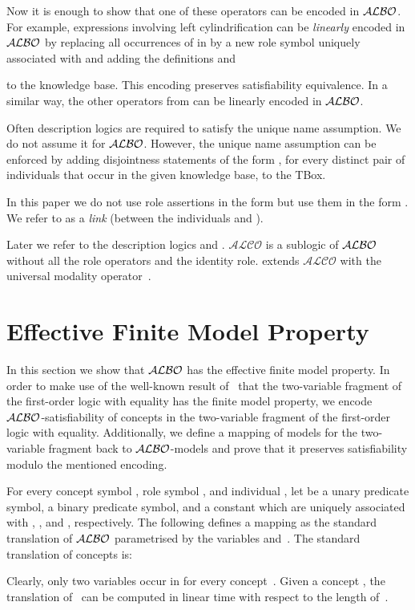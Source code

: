 \documentclass[leqno
,pdflatex
,prodmode
,acmtocl
]{acmsmall}
\newcommand{\mathcmd}[1]{\ensuremath{#1}\xspace}
\newcommand{\dlfont}{\mathcal}
\newcommand{\dl}[1]{\mathcmd{\dlfont{#1}}}
\newcommand{\ALBOid}{\dl{ALBO\smash[t]{\mbox{}}}}
\newcommand{\ALCO}{\dl{ALCO}}
\begin{document}
Now it is enough to show that one of these operators can be encoded in \ALBOid.
For example, expressions involving left cylindrification can be
\emph{linearly} encoded in \ALBOid by replacing all occurrences of
 in  by a new role symbol  uniquely associated with 
and adding the definitions
 and

to the knowledge base.
This encoding preserves satisfiability equivalence.
In a similar way, the other operators from 
 can be linearly encoded in \ALBOid.

Often description logics are required to satisfy the unique name
assumption.
We do not assume it for \ALBOid.
However, the
unique name assumption can be enforced by adding disjointness
statements of the form , for
every distinct pair of individuals that occur in the given knowledge base, to the TBox.

In this paper we do not use role assertions in the form
 but use them in the form .
We refer to 
as a \emph{link} (between the individuals 
and ).

Later we refer to the description logics  and .
\ALCO is a sublogic of \ALBOid without all the role operators and the identity role.
 extends \ALCO with the universal modality operator~.

\section{Effective Finite Model Property}
\label{section: efmp}

In this section we show that \ALBOid has the effective finite model
property. In order to make use of the well-known result of~
that the two-variable fragment of the first-order logic with equality
has the finite model property,
we encode \ALBOid-satisfiability of concepts in the
two-variable fragment of the first-order logic with equality.
Additionally, we define a mapping of models for the two-variable fragment back to \ALBOid-models
and prove that it preserves satisfiability modulo the mentioned encoding.

For every concept symbol , role symbol , and individual ,
let  be a unary predicate symbol, 
a binary predicate symbol, and   a constant which
are uniquely associated with , , and , respectively.
The following defines a mapping  as the standard translation of \ALBOid
parametrised by the variables  and~.
The standard translation of concepts is:

Clearly, only two variables occur in  for every concept~.
Given a concept , the translation  of~
can be computed in linear time with respect to the length of~.
\end{document}
